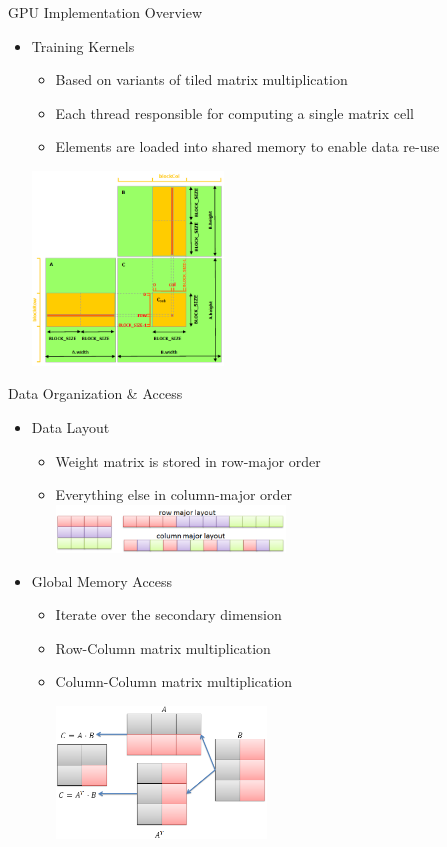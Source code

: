 \begin{frame}{GPU Implementation Overview}
\begin{itemize}
\item{Training Kernels}
\begin{itemize}
\item{ Based on variants of tiled matrix multiplication }
\item{ Each thread responsible for computing a single matrix cell }
\item{ Elements are loaded into shared memory to enable data re-use }
\end{itemize}

\includegraphics[width=2.0in]{matrix-multiplication-with-shared-memory.png}

\end{itemize}
\end{frame}

\begin{frame}{Data Organization \& Access}
\begin{itemize}

\item{Data Layout}
\begin{itemize}
	\item{Weight matrix is stored in row-major order}
	\item{Everything else in column-major order}
	\includegraphics[width=2.4in]{gpu_data_layout.png}
\end{itemize}

\item{Global Memory Access}
\begin{itemize}
	\item{Iterate over the secondary dimension}
	\item{Row-Column matrix multiplication}
	\item{Column-Column matrix multiplication}
	
	\includegraphics[width=2.2in]{gpu_mmul.png}
\end{itemize}

\end{itemize}
\end{frame}

